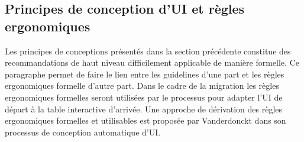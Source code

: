 \subsection{Principes de conception d'UI et règles ergonomiques}
\label{sec:chap2:3:2}
Les principes de conceptions présentés dans la section précédente constitue des recommandations de haut niveau difficilement applicable de manière formelle. Ce paragraphe permet de faire le lien entre les guidelines d'une part  et les règles ergonomiques formelle d'autre part. Dans le cadre de la migration les règles ergonomiques formelles seront utilisées par le processus pour adapter l'UI de départ à la table interactive d'arrivée. Une approche de dérivation des règles ergonomiques formelles et utilisables est proposée par Vanderdonckt \citep{Vanderdonckt1997} dans son processus de conception automatique d'UI.

